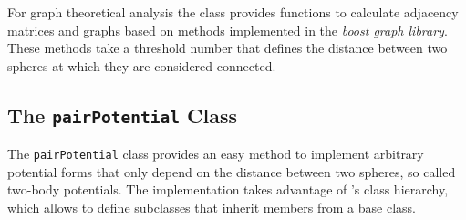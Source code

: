 For graph theoretical analysis the class provides functions to calculate
adjacency matrices and graphs based on methods implemented in the \textit{boost
graph library}\autocite{_boost_2002}. These methods take a threshold number
that defines the distance between two spheres at which they are considered
connected.

\subsection{The \texttt{pairPotential} Class}
\label{sec:thepairpotentialclass}

The \texttt{pairPotential} class provides an easy method to implement arbitrary
potential forms that only depend on the distance between two spheres, so called
two-body potentials. The implementation takes advantage of \Cpp's class
hierarchy, which allows to define subclasses that inherit members from a base
class.


